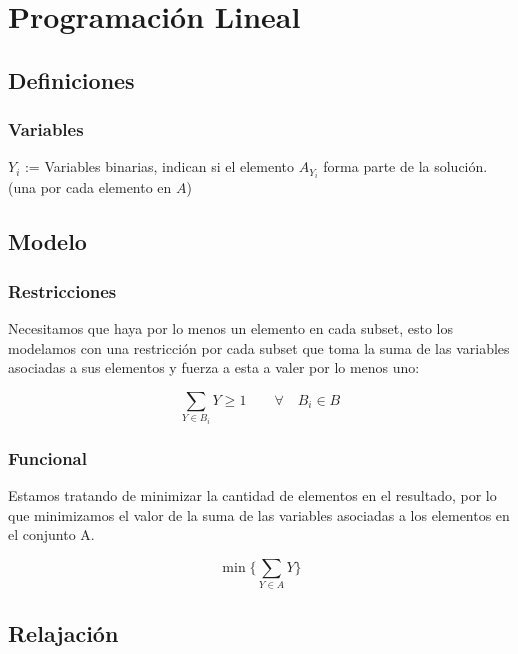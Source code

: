 \section{Programación Lineal}

\subsection{Definiciones}

\subsubsection{Variables}

\begin{center}
    $Y_i$ := Variables binarias, indican si el elemento $A_{Y_i}$ forma parte
    de la solución. \\ (una por cada elemento en $A$)
\end{center}

\subsection{Modelo}

\subsubsection{Restricciones}

Necesitamos que haya por lo menos un elemento en cada subset, esto los
modelamos con una restricción por cada subset que toma la suma de las variables
asociadas a sus elementos y fuerza a esta a valer por lo menos uno:

\begin{equation}
    \sum_{Y \in B_i} Y \ge 1 \qquad \forall \quad B_i \in B
\end{equation}

\subsubsection{Funcional}

Estamos tratando de minimizar la cantidad de elementos en el resultado, por lo
que minimizamos el valor de la suma de las variables asociadas a los elementos
en el conjunto A.

\begin{equation}
    \min \{ \sum_{Y \in A} Y \}
\end{equation}

\subsection{Relajación}

